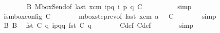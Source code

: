 \begin{isabellebody}
\ \ \ \ \ \ \isamarkupfalse%
\ B{}\ MboxSend{\isacharbrackleft}{\kern0pt}of\ {\isachardoublequoteopen}last\ {\isacharparenleft}{\kern0pt}{\isasymC}\isactrlsub {\isasymI}\isactrlsub {\isasymmm}{\isacharhash}{\kern0pt}xcm{\isacharparenright}{\kern0pt}{\isachardoublequoteclose}\ {\isachardoublequoteopen}{\isacharbang}{\kern0pt}{\isasymlangle}{\isacharparenleft}{\kern0pt}i\isactrlbsup p{\isasymrightarrow}q\isactrlesup {\isacharparenright}{\kern0pt}{\isasymrangle}{\isachardoublequoteclose}\ i\ p\ q\ C{}\ {\isachardoublequoteopen}{\isasymB}\ {}{\isachardoublequoteclose}{\isacharbrackright}{\kern0pt}\isanewline
\ \ \ \ \ \ \isamarkupfalse%
\ simp\isanewline
\ \ \ \ \isamarkupfalse%
\ {\isachardoublequoteopen}is{\isacharunderscore}{\kern0pt}mbox{\isacharunderscore}{\kern0pt}config\ C{}{\isachardoublequoteclose}\isanewline
\ \ \ \ \ \ \isamarkupfalse%
\ mbox{\isacharunderscore}{\kern0pt}step{\isacharunderscore}{\kern0pt}rev{\isacharparenleft}{\kern0pt}{}{\isacharparenright}{\kern0pt}{\isacharbrackleft}{\kern0pt}of\ {\isachardoublequoteopen}last\ {\isacharparenleft}{\kern0pt}{\isasymC}\isactrlsub {\isasymI}\isactrlsub {\isasymmm}{\isacharhash}{\kern0pt}xcm{\isacharparenright}{\kern0pt}{\isachardoublequoteclose}\ a\ {\isachardoublequoteopen}{\isasymB}\ {}{\isachardoublequoteclose}\ C{}{\isacharbrackright}{\kern0pt}\isanewline
\ \ \ \ \ \ \isamarkupfalse%
\ simp\isanewline
\ \ \ \ \isamarkupfalse%
\ \isamarkupfalse%
\ B{}\ B{}{}\ \isamarkupfalse%
\ {\isachardoublequoteopen}fst\ {\isacharparenleft}{\kern0pt}C{}\ q{\isacharparenright}{\kern0pt}\ {\isasymmidarrow}{\isacharparenleft}{\kern0pt}{\isacharquery}{\kern0pt}{\isasymlangle}{\isacharparenleft}{\kern0pt}i\isactrlbsup p{\isasymrightarrow}q\isactrlesup {\isacharparenright}{\kern0pt}{\isasymrangle}{\isacharparenright}{\kern0pt}{\isasymrightarrow}q\ {\isacharparenleft}{\kern0pt}fst\ {\isacharparenleft}{\kern0pt}C{}\ q{\isacharparenright}{\kern0pt}{\isacharparenright}{\kern0pt}{\isachardoublequoteclose}\isanewline
\ \ \ \ \ \ \isamarkupfalse%
\ C{}{\isacharunderscore}{\kern0pt}def\ C{}{\isacharunderscore}{\kern0pt}def\isanewline
\ \ \ \ \ \ \isamarkupfalse%
\ simp\isanewline
\ \ \ \ \isamarkupfalse%
\ \isamarkupfalse%

\end{isabellebody}

